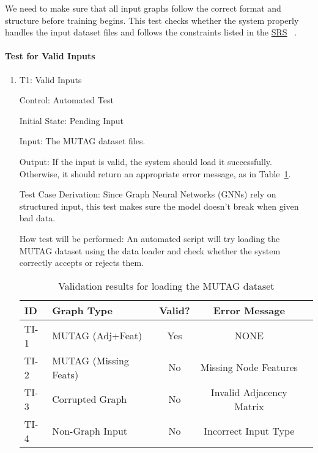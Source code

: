 \documentclass[12pt, titlepage]{article}
\begin{document}
We need to make sure that all input graphs follow the correct format and structure before training begins. This test checks whether the system properly handles the input dataset files and follows the constraints listed in the \href{https://github.com/Yuanqi-X/Re-ProtGNN/blob/main/docs/SRS/SRS.pdf}{SRS} ~\citep{Yuanqi_ReProtGNN_SRS}.
		
\paragraph{Test for Valid Inputs}

\begin{enumerate}


\item{T1: Valid Inputs\\}

Control: Automated Test
					
Initial State: Pending Input
					
Input: The MUTAG dataset files.
					
Output:  If the input is valid, the system should load it successfully. Otherwise, it should return an appropriate error message, as in Table~\ref{tab:graph_validation}.
					
Test Case Derivation: Since Graph Neural Networks (GNNs) rely on structured input, this test makes sure the model doesn't break when given bad data.
					
How test will be performed: An automated script will try loading the MUTAG dataset using the data loader and check whether the system correctly accepts or rejects them.

\begin{table}[h]
    \centering
    \setlength{\tabcolsep}{10pt} %
    \begin{tabularx}{\linewidth}{l X c c X} 
        \toprule
        \textbf{ID} & \textbf{Graph Type} & \textbf{Valid?} & \textbf{Error Message} \\
        \midrule
        TI-1 & MUTAG (Adj+Feat) & Yes & NONE \\
        TI-2 & MUTAG (Missing Feats) & No & Missing Node Features \\
        TI-3 & Corrupted Graph & No & Invalid Adjacency Matrix \\
        TI-4 & Non-Graph Input & No & Incorrect Input Type \\
        \bottomrule
    \end{tabularx}
    \caption{Validation results for loading the MUTAG dataset}
    \label{tab:graph_validation}
\end{table}

\end{enumerate}
\end{document}
